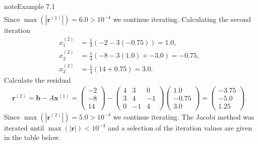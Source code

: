 \documentclass[letterpaper,10pt,english]{jupyterBook}
\begin{document}
\begin{sphinxadmonition}{note}{Example 7.1}
\begin{align*}
\end{align*}
\sphinxAtStartPar
Since \(\max(| \mathbf{r}^{(1)} |) = 6.0 > 10^{-4}\) we continue iterating. Calculating the second iteration
\begin{align*}
    x_{1}^{(2)} &= \frac{1}{4} \left( -2 - 3 (-0.75) \right) = 1.0, \\
    x_{2}^{(2)} &= \frac{1}{4} \left( -8 - 3 (1.0) + -3.0 \right) = -0.75, \\
    x_{3}^{(2)} &= \frac{1}{4} \left( 14 + 0.75 \right) = 3.0.
\end{align*}
\sphinxAtStartPar
Calculate the residual
\begin{align*}
    \mathbf{r}^{(2)} = \mathbf{b} - A \mathbf{x}^{(1)} = 
    \begin{pmatrix} -2 \\ -8 \\ 14 \end{pmatrix} -
    \begin{pmatrix} 4 & 3 & 0 \\ 3 & 4 & -1 \\ 0 & -1 & 4 \end{pmatrix}
    \begin{pmatrix} 1.0 \\ -0.75 \\ 3.0 \end{pmatrix} =
    \begin{pmatrix} -3.75 \\ -5.0 \\ 1.25 \end{pmatrix}.
\end{align*}
\sphinxAtStartPar
Since \(\max(| \mathbf{r}^{(2)} |) = 5.0 > 10^{-4}\) we continue iterating. The Jacobi method was iterated until \(\max(|\mathbf{r}|) < 10^{-4}\) and a selection of the iteration values are given in the table below.



\end{sphinxadmonition}
\end{document}
